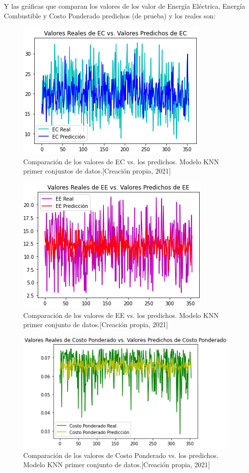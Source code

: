 \documentclass{article}
\begin{document}
Y las gráficas que comparan los valores de los valor de Energía Eléctrica, Energía Combustible y Costo Ponderado predichos (de prueba) y los reales son: 

\begin{figure}[!h]
    \centering
    \includegraphics[scale=.7]{F4/F4-im5.PNG}
    \caption{Comparación de los valores de EC vs. los predichos. Modelo KNN primer conjuntos de datos.[Creación propia, 2021]}
    \label{fig:EC1.1}
\end{figure}

\begin{figure}[!h]
    \centering
    \includegraphics[scale=.7]{F4/F4-im6.PNG}
    \caption{Comparación de los valores de EE vs. los predichos. Modelo KNN primer conjunto de datos.[Creación propia, 2021]}
    \label{fig:EE1.1}
\end{figure}

\begin{figure}[!h]
    \centering
    \includegraphics[scale=.7]{F4/F4-im7.PNG}
    \caption{Comparación de los valores de Costo Ponderado vs. los predichos. Modelo KNN primer conjunto de datos.[Creación propia, 2021]}
    \label{fig:CostoPonderado1.1}
\end{figure}
\end{document}
